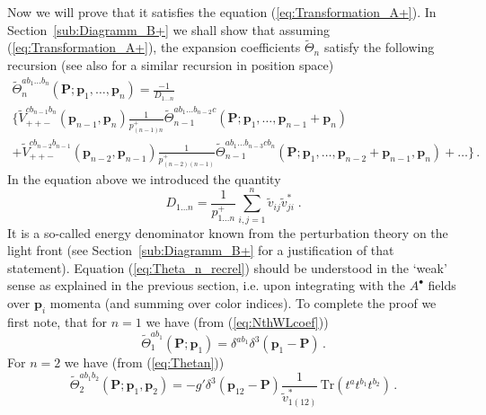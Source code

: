 \documentclass[english,american]{article}
\begin{document}
Now we will prove that it satisfies the equation (\ref{eq:Transformation_A+}).
In Section~\ref{sub:Diagramm_B+} we shall show that assuming (\ref{eq:Transformation_A+}),
the expansion coefficients $\tilde{\Theta}_{n}$ satisfy the following
recursion (see also \citep{Mansfield2006} for a similar recursion
in position space) 
\begin{multline}
\tilde{\Theta}_{n}^{ab_{1}\dots b_{n}}\left(\mathbf{P};\mathbf{p}_{1},\dots,\mathbf{p}_{n}\right)=\frac{-1}{D_{1\dots n}}\,\\
\Bigg\{\tilde{V}_{++-}^{cb_{n-1}b_{n}}\left(\mathbf{p}_{n-1},\mathbf{p}_{n}\right)\frac{1}{p_{\left(n-1\right)n}^{+}}\tilde{\Theta}_{n-1}^{ab_{1}\dots b_{n-2}c}\left(\mathbf{P};\mathbf{p}_{1},\dots,\mathbf{p}_{n-1}+\mathbf{p}_{n}\right)\\
+\tilde{V}_{++-}^{cb_{n-2}b_{n-1}}\left(\mathbf{p}_{n-2},\mathbf{p}_{n-1}\right)\frac{1}{p_{\left(n-2\right)\left(n-1\right)}^{+}}\tilde{\Theta}_{n-1}^{ab_{1}\dots b_{n-3}cb_{n}}\left(\mathbf{P};\mathbf{p}_{1},\dots,\mathbf{p}_{n-2}+\mathbf{p}_{n-1},\mathbf{p}_{n}\right)+\dots\Bigg\}\,.\label{eq:Theta_n_recrel}
\end{multline}
In the equation above we introduced  the quantity
\begin{equation}
D_{1\dots n}=\frac{1}{p_{1\dots n}^{+}}\sum_{i,j=1}^{n}\tilde{v}_{ij}\tilde{v}_{ji}^{*} \; .\label{eq:D_vivj}
\end{equation}
It is a so-called energy denominator known from the perturbation
theory on the light front \citep{Lepage1980} (see Section~\ref{sub:Diagramm_B+} for
a justification of that statement). Equation (\ref{eq:Theta_n_recrel})
should be understood in the `weak' sense as explained in the previous section, i.e. upon integrating
with the $A^{\bullet}$ fields over $\mathbf{p}_{i}$ momenta (and
summing over color indices).  To complete the proof we first note,
that for $n=1$ we have (from (\ref{eq:NthWLcoef}))
\begin{equation}
\tilde{\Theta}_{1}^{ab_{1}}\left(\mathbf{P};\mathbf{p}_{1}\right)=\delta^{ab_{1}}\delta^{3}\left(\mathbf{p}_{1}-\mathbf{P}\right)\,.
\end{equation}
For $n=2$ we have (from (\ref{eq:Thetan}))
\begin{equation}
\tilde{\Theta}_{2}^{ab_{1}b_{2}}\left(\mathbf{P};\mathbf{p}_{1},\mathbf{p}_{2}\right)=-g'\delta^{3}\left(\mathbf{p}_{12}-\mathbf{P}\right)\frac{1}{\tilde{v}_{1\left(12\right)}^{*}}\,\mathrm{Tr}\left(t^{a}t^{b_{1}}t^{b_{2}}\right)\,.
\end{equation}
\end{document}
